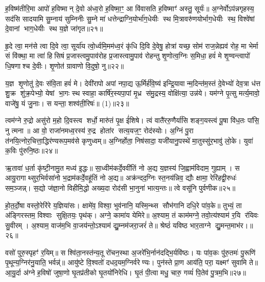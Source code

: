{\anuvakamend[{अ॒सि॒ षड्विꣳ॑शतिश्च॥11॥}]}

ह॒विष्म॑तीरि॒मा आपो॑ ह॒विष्मान् दे॒वो अ॑ध्व॒रो ह॒विष्मा॒ꣳ॒ आ वि॑वासति ह॒विष्माꣳ॑ अस्तु॒ सूर्यः॑॥ अ॒ग्नेर्वोऽप॑न्नगृहस्य॒ सद॑सि सादयामि सु॒म्नाय॑ सुम्निनीः सु॒म्ने मा॑ धत्तेन्द्राग्नि॒योर्भा॑ग॒धेयीः स्थ मि॒त्रावरु॑णयोर्भाग॒धेयीः स्थ॒ विश्वे॑षां दे॒वानां भाग॒धेयीः स्थ य॒ज्ञे जा॑गृत॥२१॥

{\anuvakamend[{ह॒विष्म॑ती॒श्चतु॑स्रिशत्॥12॥}]}

हृ॒दे त्वा॒ मन॑से त्वा दि॒वे त्वा॒ सूर्या॑य त्वो॒र्ध्वमि॒मम॑ध्व॒रं कृ॑धि दि॒वि दे॒वेषु॒ होत्रा॑ यच्छ॒ सोम॑ राज॒न्नेह्यव॑ रोह॒ मा भेर्मा सं वि॑क्था॒ मा त्वा॑ हिसिषं प्र॒जास्त्वमु॒पाव॑रोह प्र॒जास्त्वामु॒पाव॑ रोहन्तु शृ॒णोत्व॒ग्निः स॒मिधा॒ हवं॑ मे शृ॒ण्वन्त्वापो॑ धि॒षणाश्च दे॒वीः। शृ॒णोत॑ ग्रावाणो वि॒दुषो॒ नु॥२२॥

य॒ज्ञ शृ॒णोतु॑ दे॒वः स॑वि॒ता हवं॑ मे। देवी॑रापो अपां नपा॒द्य ऊ॒र्मिर्\mbox{}ह॑वि॒ष्य॑ इन्द्रि॒यावान्म॒दिन्त॑म॒स्तं दे॒वेभ्यो॑ देव॒त्रा ध॑त्त शु॒क्र शु॑क्र॒पेभ्यो॒ येषां भा॒गः स्थ स्वाहा॒ कार्\mbox{}षि॑र॒स्यपा॒पां मृ॒ध्र स॑मु॒द्रस्य॒ वोक्षि॑त्या॒ उन्न॑ये। यम॑ग्ने पृ॒त्सु मर्त्य॒मावो॒ वाजे॑षु॒ यं जु॒नाः। स यन्ता॒ शश्व॑ती॒रिषः॑॥ (1)॥२३॥

{\anuvakamend[{नु स॒प्तच॑त्वारिशच्च॥13॥}]}

त्वम॑ग्ने रु॒द्रो असु॑रो म॒हो दि॒वस्त्व शर्धो॒ मारु॑तं पृ॒क्ष ई॑शिषे। त्वं वातै॑ररु॒णैर्या॑सि शङ्ग॒यस्त्वं पू॒षा वि॑ध॒तः पा॑सि॒ नु त्मना॥ आ वो॒ राजा॑नमध्व॒रस्य॑ रु॒द्र होता॑र सत्य॒यज॒ꣳ॒ रोद॑स्योः। अ॒ग्निं पु॒रा त॑नयि॒त्नोर॒चित्ता॒द्धिर॑ण्यरूप॒मव॑से कृणुध्वम्॥ अ॒ग्निर्होता॒ निष॑सादा॒ यजी॑यानु॒पस्थे॑ मा॒तुस्सु॑र॒भावु॑ लो॒के। युवा॑ क॒विः पु॑रुनि॒ष्ठः॥२४॥

ऋ॒तावा॑ ध॒र्ता कृ॑ष्टी॒नामु॒त मध्य॑ इ॒द्धः॥ सा॒ध्वीम॑कर्दे॒ववी॑तिं नो अ॒द्य य॒ज्ञस्य॑ जि॒ह्वाम॑विदाम॒ गुह्याम्। स आयु॒रागाथ्सुर॒भिर्वसा॑नो भ॒द्राम॑कर्दे॒वहू॑तिं नो अ॒द्य॥ अक्र॑न्दद॒ग्निः स्त॒नय॑न्निव॒ द्यौः क्षामा॒ रेरि॑हद्वी॒रुधः॑ सम॒ञ्जन्न्। स॒द्यो ज॑ज्ञा॒नो विहीमि॒द्धो अख्य॒दा रोद॑सी भा॒नुना॑ भात्य॒न्तः॥ त्वे वसू॑नि पुर्वणीक॥२५॥

हो॒त॒र्दो॒षा वस्तो॒रेरि॑रे य॒ज्ञिया॑सः। क्षामे॑व॒ विश्वा॒ भुव॑नानि॒ यस्मि॒न्थ्स सौभ॑गानि दधि॒रे पा॑व॒के॥ तुभ्यं॒ ता अ॑ङ्गिरस्तम॒ विश्वाः सुक्षि॒तयः॒ पृथ॑क्। अग्ने॒ कामा॑य येमिरे॥ अ॒श्याम॒ तं काम॑मग्ने॒ तवो॒त्य॑श्याम॑ र॒यि र॑यिवः सु॒वीरम्। अ॒श्याम॒ वाज॑म॒भि वा॒जय॑न्तो॒ऽश्याम॑ द्यु॒म्नम॑जरा॒जरं॑ ते॥ श्रेष्ठं॑ यविष्ठ भार॒ताग्ने द्यु॒मन्त॒माभ॑र।॥२६॥

वसो॑ पुरु॒स्पृहꣳ॑ र॒यिम्॥ स श्वि॑ता॒नस्त॑न्य॒तू रो॑चन॒स्था अ॒जरे॑भि॒र्नान॑दद्भि॒र्यवि॑ष्ठः। यः पा॑व॒कः पु॑रु॒तमः॑ पु॒रूणि॑ पृ॒थून्य॒ग्निर॑नु॒याति॒ भर्वन्न्॑॥ आयु॑ष्टे वि॒श्वतो॑ दधद॒यम॒ग्निर्वरेण्यः। पुन॑स्ते प्रा॒ण आय॑ति॒ परा॒ यक्ष्मꣳ॑ सुवामि ते॥ आ॒यु॒र्दा अ॑ग्ने ह॒विषो॑ जुषा॒णो घृ॒तप्र॑तीको घृ॒तयो॑निरेधि। घृ॒तं पी॒त्वा मधु॒ चारु॒ गव्यं॑ पि॒तेव॑ पु॒त्रम॒भि॥२७॥

